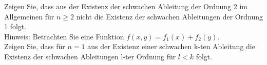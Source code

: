 Zeigen Sie, dass aus der Existenz der schwachen Ableitung der Ordnung 2 im Allgemeinen für $n \geq 2$ nicht die Existenz der schwachen Ableitungen der Ordnung 1 folgt.\\
Hinweis: Betrachten Sie eine Funktion $f(x,y) = f_1(x) + f_2(y)$.\\
Zeigen Sie, dass für $n = 1$ aus der Existenz einer schwachen k-ten Ableitung die Existenz der schwachen Ableitungen l-ter Ordnung für $l < k$ folgt.